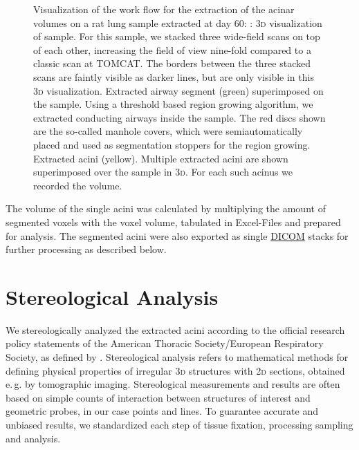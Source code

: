 \documentclass[%
	paper=a4,%
	DIV=calc,%
	twoside=true,%
	abstract=true,%
	]{scrartcl}
\newlength\imagescale           %
\newcommand{\eg}{e.\,g.\xspace}
\newcommand{\twod}{2\textsc{d}\xspace}
\newcommand{\threed}{3\textsc{d}\xspace}
\begin{document}
\begin{figure}
{%
		\label{subfig:extracted acini}%
		}
	\caption{Visualization of the work flow for the extraction of the acinar volumes on a rat lung sample extracted at day 60: %
		: \threed visualization of sample. For this sample, we stacked three wide-field scans on top of each other, increasing the field of view nine-fold compared to a classic scan at TOMCAT. The borders between the three stacked scans are faintly visible as darker lines, but are only visible in this \threed visualization. %
		 Extracted airway segment (green) superimposed on the sample. Using a threshold based region growing algorithm, we extracted conducting airways inside the sample. The red discs shown are the so-called manhole covers, which were semiautomatically placed and used as segmentation stoppers for the region growing. %
		 Extracted acini (yellow). Multiple extracted acini are shown superimposed over the sample in \threed. For each such acinus we recorded the volume.%
		}
	\label{fig:workflow}
\end{figure}

The volume of the single acini was calculated by multiplying the amount of segmented voxels with the voxel volume, tabulated in Excel-Files and prepared for analysis. The segmented acini were also exported as single \href{https://secure.wikimedia.org/wikipedia/en/w/index.php?title=Digital_Imaging_and_Communications_in_Medicine&oldid=415023605}{DICOM} stacks for further processing as described below.

\section{Stereological Analysis}
We stereologically analyzed the extracted acini according to the official research policy statements of the American Thoracic Society/European Respiratory Society, as defined by \citet{Hsia2010}. Stereological analysis refers to mathematical methods for defining physical properties of irregular \threed structures with \twod sections, obtained \eg by tomographic imaging. Stereological measurements and results are often based on simple counts of interaction between structures of interest and geometric probes, in our case points and lines. To guarantee accurate and unbiased results, we standardized each step of tissue fixation, processing sampling and analysis.
\end{document}
